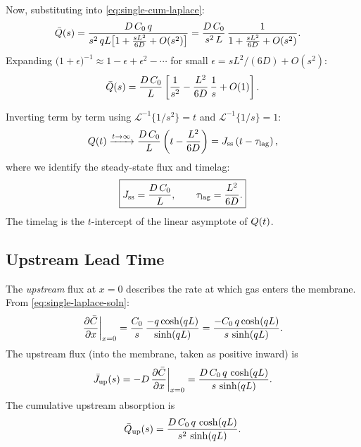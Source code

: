 Now, substituting into \cref{eq:single-cum-laplace}:
\begin{align}
  \bar{Q}(s)
  &= \frac{D\,C_0\,q}{s^2\,qL\bigl[1 + \frac{sL^2}{6D} + O(s^2)\bigr]}
  = \frac{D\,C_0}{s^2\,L}\,
    \frac{1}{1 + \frac{sL^2}{6D} + O(s^2)}.
\end{align}
Expanding $\bigl(1 + \epsilon\bigr)^{-1} \approx 1 - \epsilon + \epsilon^2
- \cdots$ for small $\epsilon = sL^2/(6D) + O(s^2)$:
\begin{equation}
  \label{eq:single-cum-expanded}
  \bar{Q}(s) = \frac{D\,C_0}{L}\left[\frac{1}{s^2}
  - \frac{L^2}{6D}\,\frac{1}{s} + O(1)\right].
\end{equation}

Inverting term by term using $\mathcal{L}^{-1}\{1/s^2\} = t$ and
$\mathcal{L}^{-1}\{1/s\} = 1$:
\begin{equation}
  \label{eq:single-Q-asymptote}
  Q(t) \xrightarrow{t\to\infty} \frac{D\,C_0}{L}
  \left(t - \frac{L^2}{6D}\right)
  = J_{\mathrm{ss}}\left(t - \tau_{\mathrm{lag}}\right),
\end{equation}
where we identify the steady-state flux and timelag:
\begin{equation}
  \label{eq:single-Jss-tlag}
  \boxed{J_{\mathrm{ss}} = \frac{D\,C_0}{L}, \qquad
  \tau_{\mathrm{lag}} = \frac{L^2}{6D}.}
\end{equation}
The timelag is the $t$-intercept of the linear asymptote of $Q(t)$.

\subsection{Upstream Lead Time}
\label{sec:single-upstream}

The \emph{upstream} flux at $x = 0$ describes the rate at which gas enters
the membrane.  From \cref{eq:single-laplace-soln}:
\begin{equation}
  \pdv{\bar{C}}{x}\bigg|_{x=0}
  = \frac{C_0}{s}\,\frac{-q\cosh(qL)}{\sinh(qL)}
  = \frac{-C_0\,q\cosh(qL)}{s\,\sinh(qL)}.
\end{equation}
The upstream flux (into the membrane, taken as positive inward) is
\begin{equation}
  \label{eq:single-upstream-flux}
  \bar{J}_{\mathrm{up}}(s) = -D\,\pdv{\bar{C}}{x}\bigg|_{x=0}
  = \frac{D\,C_0\,q\,\cosh(qL)}{s\,\sinh(qL)}.
\end{equation}
The cumulative upstream absorption is
\begin{equation}
  \label{eq:single-cum-up}
  \bar{Q}_{\mathrm{up}}(s)
  = \frac{D\,C_0\,q\,\cosh(qL)}{s^2\,\sinh(qL)}.
\end{equation}

